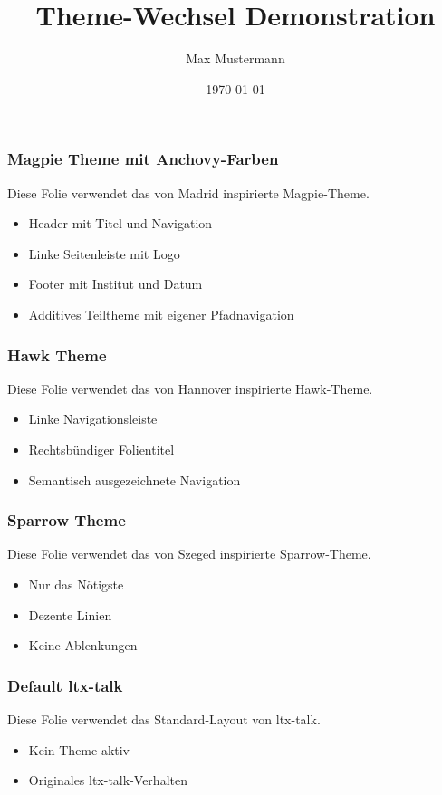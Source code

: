 \documentclass{ltx-talk}
\title{Theme-Wechsel Demonstration}
\author{Max Mustermann}
\date{\today}
\begin{document}
\begin{frame}
  \frametitle{Magpie Theme mit Anchovy-Farben}
  Diese Folie verwendet das von Madrid inspirierte Magpie-Theme.
  \begin{itemize}
    \item Header mit Titel und Navigation
    \item Linke Seitenleiste mit Logo
    \item Footer mit Institut und Datum
    \item Additives Teiltheme mit eigener Pfadnavigation
  \end{itemize}
\end{frame}


\begin{frame}
  \frametitle{Hawk Theme}
  Diese Folie verwendet das von Hannover inspirierte Hawk-Theme.
  \begin{itemize}
    \item Linke Navigationsleiste
    \item Rechtsbündiger Folientitel
    \item Semantisch ausgezeichnete Navigation
  \end{itemize}
\end{frame}


\begin{frame}
  \frametitle{Sparrow Theme}
  Diese Folie verwendet das von Szeged inspirierte Sparrow-Theme.
  \begin{itemize}
    \item Nur das Nötigste
    \item Dezente Linien
    \item Keine Ablenkungen
  \end{itemize}
\end{frame}


\begin{frame}
  \frametitle{Default ltx-talk}
  Diese Folie verwendet das Standard-Layout von ltx-talk.
  \begin{itemize}
    \item Kein Theme aktiv
    \item Originales ltx-talk-Verhalten
  \end{itemize}
\end{frame}
\end{document}
